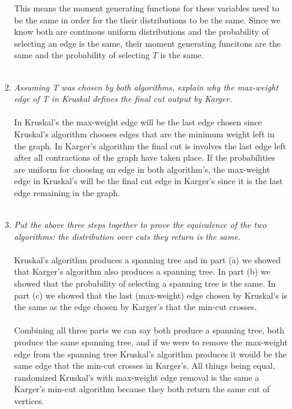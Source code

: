 \documentclass[12pt]{article}
\begin{document}
\begin{enumerate}
\begin{enumerate}
$$			$$
			This means the moment generating functions for these variables need to be the same in order for the their distributions to be the same.  Since we know both are continous uniform distributions and the probability of selecting an edge is the same, their moment generating funcitons are the same and the probability of selecting $T$ is the same.\\
			\\
			\item \textit{Assuming T was chosen by both algorithms, explain why the max-weight edge of T in Kruskal defines the final cut output by Karger.}\\
			\\
			In Kruskal's the max-weight edge will be the last edge chosen since Kruskal's algorithm chooses edges that are the minimum weight left in the graph.  In Karger's algorithm the final cut is involves the last edge left after all contractions of the graph have taken place.  If the probabilities are uniform for choosing an edge in both algorithm's, the max-weight edge in Kruskal's will be the final cut edge in Karger's since it is the last edge remaining in the graph.\\ 
			\\
			\item \textit{Put the above three steps together to prove the equivalence of the two algorithms: the distribution over cuts they return is the same.}\\
			\\
			Kruskal's algorithm produces a spanning tree and in part (a) we showed that Karger's algorithm also produces a spanning tree.  In part (b) we showed that the probability of selecting a spanning tree is the same.  In part (c) we showed that the last (max-weight) edge chosen by Kruskal's is the same as the edge chosen by Karger's that the min-cut crosses.\\
			\\
			Combining all three parts we can say both produce a spanning tree, both produce the same spanning tree, and if we were to remove the max-weight edge from the spanning tree Kruskal's algorithm produces it would be the same edge that the min-cut crosses in Karger's.  All things being equal, randomized Kruskal's with max-weight edge removal is the same a Karger's min-cut algorithm because they both return the same cut of vertices.\\
		\end{enumerate}


\end{enumerate}
\end{document}
